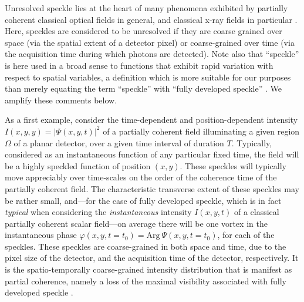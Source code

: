 \documentclass{iucr}              %
\begin{document}
Unresolved speckle lies at the heart of many phenomena exhibited by partially coherent classical optical fields in general, and classical x-ray fields in particular \cite{Nugent2003,paganin_book,Nesterets2008}.  Here, speckles are considered to be unresolved if they are coarse grained over space (via the spatial extent of a detector pixel) or coarse-grained over time (via the acquisition time during which photons are detected).  Note also that ``speckle'' is here used in a broad sense to functions that exhibit rapid variation with respect to spatial variables, a definition which is more suitable for our purposes than merely equating the term ``speckle'' with ``fully developed speckle'' . We amplify these comments below.  

As a first example, consider the time-dependent and position-dependent intensity $I(x,y,y)=|\Psi(x,y,t)|^2$ of a partially coherent field illuminating a given region $\Omega$ of a planar detector, over a given time interval of duration $T$.  Typically, considered as an instantaneous function of any particular fixed time, the field will be a highly speckled function of position $(x,y)$.  These speckles will typically move appreciably over time-scales on the order of the coherence time of the partially coherent field.  The characteristic transverse extent of these speckles may be rather small, and---for the case of fully developed speckle, which is in fact {\em typical} when considering the {\em instantaneous} intensity $I(x,y,t)$ of a classical partially coherent scalar field---on average there will be one vortex in the instantaneous phase $\varphi(x,y,t=t_0)=\textrm{Arg} ~\Psi(x,y,t=t_0)$, for each of the speckles.  These speckles are coarse-grained in both space and time, due to the pixel size of the detector, and the acquisition time of the detector, respectively.  It is the spatio-temporally coarse-grained intensity distribution that is manifest as partial coherence, namely a loss of the maximal visibility associated with fully developed speckle \cite{paganin_book}.  
\end{document}
